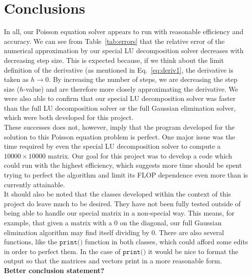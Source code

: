 \documentclass[12pt]{article}
\numberwithin{equation}{section}
\begin{document}
\section{Conclusions}
\label{sec:conclusions}

In all, our Poisson equation solver appears to run with reasonable efficiency and accuracy.  We can see from Table~\ref{tab:errors} that the relative error of the numerical approximation by our special LU decomposition solver decreases with decreasing step size.  This is expected because, if we think about the limit definition of the derivative (as mentioned in Eq.~\ref{eq:deriv1}, the derivative is taken as $h\rightarrow0$.  By increasing the number of steps, we are decreasing the step size ($h$-value) and are therefore more closely approximating the derivative.  We were also able to confirm that our special LU decomposition solver was faster than the full LU decomposition solver or the full Gaussian elimination solver, which were both developed for this project.  
\\\indent These successes does not, however, imply that the program developed for the solution to this Poisson equation problem is perfect.  One major issue was the time required by even the special LU decomposition solver to compute a $10000\times10000$ matrix.  Our goal for this project was to develop a code which could run with the highest efficiency, which suggests more time should be spent trying to perfect the algorithm and limit its FLOP dependence even more than is currently attainable.
\\\indent It should also be noted that the classes developed within the context of this project do leave much to be desired.  They have not been fully tested outside of being able to handle our special matrix in a non-special way.  This means, for example, that given a matrix with a 0 on the diagonal, our full Gaussian elimination algorithm may find itself dividing by 0.  There are also several functions, like the $\texttt{print()}$ function in both classes, which could afford some edits in order to perfect them.  In the case of $\texttt{print()}$ it would be nice to format the output so that the matrices and vectors print in a more reasonable form.
\\\textbf{Better conclusion statement?}
\end{document}
